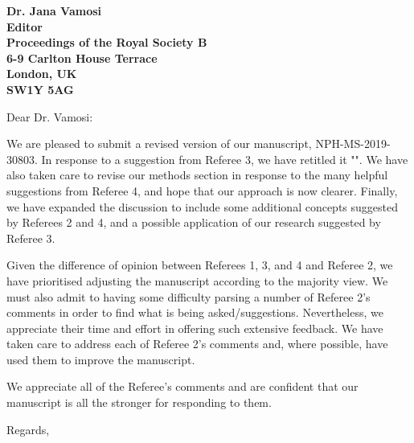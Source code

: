 \documentclass[12pt]{letter}
\begin{document}
\begin{letter}{\bf Dr. Jana Vamosi\\
               Editor\\
               Proceedings of the Royal Society B\\
               6-9 Carlton House Terrace\\
               London, UK\\
               SW1Y 5AG\\
                }

\opening{Dear Dr. Vamosi:}

We are pleased to submit a revised version of our manuscript, NPH-MS-2019-30803. In response to a suggestion from Referee 3, we have retitled it "". We have also taken care to revise our methods section in response to the many helpful suggestions from Referee 4, and hope that our approach is now clearer. Finally, we have expanded the discussion to include some additional concepts suggested by Referees 2 and 4, and a possible application of our research suggested by Referee 3. 


Given the difference of opinion between Referees 1, 3, and 4 and Referee 2, we have prioritised adjusting the manuscript according to the majority view. We must also admit to having some difficulty parsing a number of Referee 2's comments in order to find what is being asked/suggestions. Nevertheless, we appreciate their time and effort in offering such extensive feedback. We have taken care to address each of Referee 2's comments and, where possible, have used them to improve the manuscript.


We appreciate all of the Referee's comments and are confident that our manuscript is all the stronger for responding to them.


\closing{Regards,}


\end{letter}

\newpage

\setcounter{page}{1}



\end{document}
